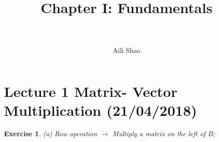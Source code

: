 \documentclass[paper=a4, fontsize=11pt]{scrartcl} %
\title{	
\normalfont \normalsize 
%
\horrule{0.5pt} \\[0.4cm] %
\huge Chapter I: Fundamentals   \\ %
\horrule{2pt} \\[0.5cm] %
}
\date{}
\author{Aili Shao}
\numberwithin{equation}{section} %
\numberwithin{figure}{section} %
\numberwithin{table}{section} %
\newtheorem{exercise}{Exercise}
\numberwithin{exercise}{section}
\begin{document}
\maketitle %


\section{ Lecture 1 Matrix- Vector Multiplication (21/04/2018)}

\begin{exercise} 
(a)
Row operation $\to$ Multiply a matrix on the left of $B$;


\end{exercise}
\end{document}
